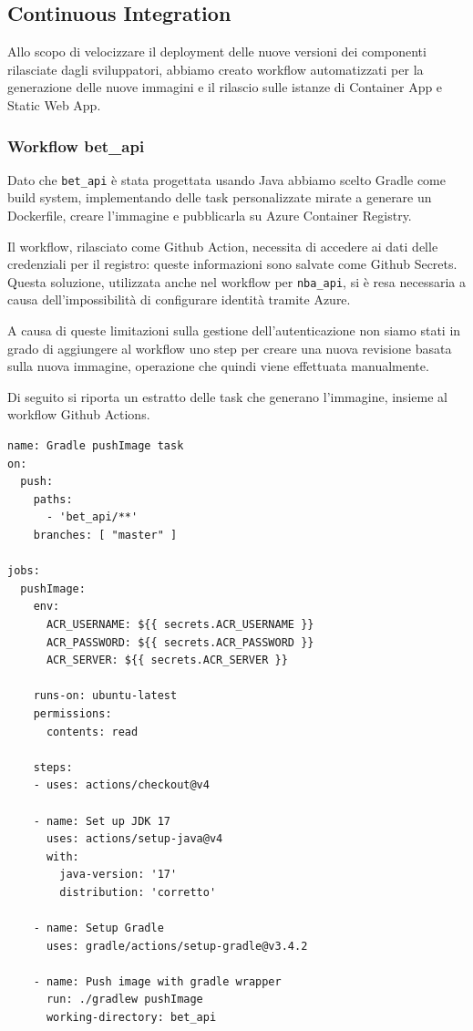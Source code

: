 \subsection{Continuous Integration}
Allo scopo di velocizzare il deployment delle nuove versioni dei componenti rilasciate dagli sviluppatori, abbiamo creato workflow automatizzati per la generazione delle nuove immagini e il rilascio sulle istanze di Container App e Static Web App.

\subsubsection{Workflow bet\_api}
Dato che \texttt{bet\_api} è stata progettata usando Java abbiamo scelto Gradle come build system, implementando delle task personalizzate mirate a generare un Dockerfile, creare l'immagine e pubblicarla su Azure Container Registry.

Il workflow, rilasciato come Github Action, necessita di accedere ai dati delle credenziali per il registro: queste informazioni sono salvate come Github Secrets. Questa soluzione, utilizzata anche nel workflow per \texttt{nba\_api}, si è resa necessaria a causa dell'impossibilità di configurare identità tramite Azure.

A causa di queste limitazioni sulla gestione dell'autenticazione non siamo stati in grado di aggiungere al workflow uno step per creare una nuova revisione basata sulla nuova immagine, operazione che quindi viene effettuata manualmente.

Di seguito si riporta un estratto delle task che generano l'immagine, insieme al workflow Github Actions.

\begin{verbatim}
name: Gradle pushImage task
on:
  push:
    paths:
      - 'bet_api/**'
    branches: [ "master" ]

jobs:
  pushImage:
    env:
      ACR_USERNAME: ${{ secrets.ACR_USERNAME }}
      ACR_PASSWORD: ${{ secrets.ACR_PASSWORD }}
      ACR_SERVER: ${{ secrets.ACR_SERVER }}

    runs-on: ubuntu-latest
    permissions:
      contents: read

    steps:
    - uses: actions/checkout@v4

    - name: Set up JDK 17
      uses: actions/setup-java@v4
      with:
        java-version: '17'
        distribution: 'corretto'

    - name: Setup Gradle
      uses: gradle/actions/setup-gradle@v3.4.2

    - name: Push image with gradle wrapper
      run: ./gradlew pushImage
      working-directory: bet_api
\end{verbatim}

